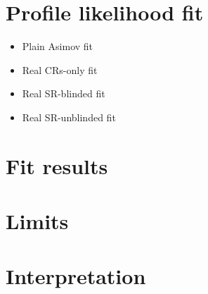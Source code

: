 \documentclass[../thesis.tex]{subfiles}
\begin{document}
\vspace{-1\baselineskip}
\section{Profile likelihood fit}
\label{sec:LH_fit}

\begin{itemize}
\item Plain Asimov fit
\item Real CRs-only fit
\item Real SR-blinded fit
\item Real SR-unblinded fit
\end{itemize}


\section{Fit results}
\label{sec:results}


\section{Limits}
\label{sec:limits}


\section{Interpretation}
\label{sec:interpretation}
\end{document}
